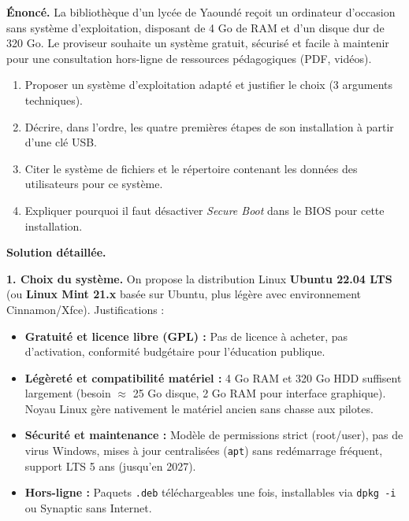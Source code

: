 \documentclass[11pt]{article}
\begin{document}
\begin{exoresolu}
\textbf{Énoncé.} La bibliothèque d'un lycée de Yaoundé reçoit un ordinateur d'occasion sans système d'exploitation, disposant de 4 Go de RAM et d'un disque dur de 320 Go. Le proviseur souhaite un système gratuit, sécurisé et facile à maintenir pour une consultation hors-ligne de ressources pédagogiques (PDF, vidéos).
\begin{enumerate}
  \item Proposer un système d'exploitation adapté et justifier le choix (3 arguments techniques).
  \item Décrire, dans l'ordre, les quatre premières étapes de son installation à partir d'une clé USB.
  \item Citer le système de fichiers et le répertoire contenant les données des utilisateurs pour ce système.
  \item Expliquer pourquoi il faut désactiver \emph{Secure Boot} dans le BIOS pour cette installation.
\end{enumerate}
\tcblower
\textbf{Solution détaillée.}

\textbf{1. Choix du système.} On propose la distribution Linux \textbf{Ubuntu 22.04 LTS} (ou \textbf{Linux Mint 21.x} basée sur Ubuntu, plus légère avec environnement Cinnamon/Xfce). Justifications :
\begin{itemize}
  \item \textbf{Gratuité et licence libre (GPL) :} Pas de licence à acheter, pas d'activation, conformité budgétaire pour l'éducation publique.
  \item \textbf{Légèreté et compatibilité matériel :} 4 Go RAM et 320 Go HDD suffisent largement (besoin $\approx$ 25 Go disque, 2 Go RAM pour interface graphique). Noyau Linux gère nativement le matériel ancien sans chasse aux pilotes.
  \item \textbf{Sécurité et maintenance :} Modèle de permissions strict (root/user), pas de virus Windows, mises à jour centralisées (\texttt{apt}) sans redémarrage fréquent, support LTS 5 ans (jusqu'en 2027).
  \item \textbf{Hors-ligne :} Paquets \texttt{.deb} téléchargeables une fois, installables via \texttt{dpkg -i} ou Synaptic sans Internet.
\end{itemize}


\end{exoresolu}
\end{document}
